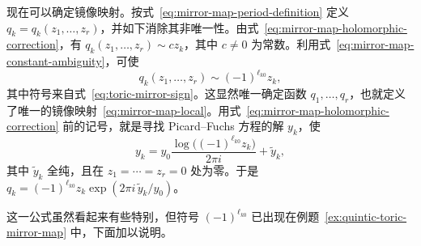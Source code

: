 现在可以确定镜像映射。按式~\eqref{eq:mirror-map-period-definition} 定义 $q_k=q_k(z_1,\ldots,z_r)$，并如下消除其非唯一性。由式~\eqref{eq:mirror-map-holomorphic-correction}，有 $q_k(z_1,\ldots,z_r)\sim cz_k$，其中 $c\ne0$ 为常数。利用式~\eqref{eq:mirror-map-constant-ambiguity}，可使
\begin{equation}\label{eq:toric-mirror-normalization}
q_k(z_1,\ldots,z_r)\sim(-1)^{\ell_{k0}}z_k,
\end{equation}
其中符号来自式~\eqref{eq:toric-mirror-sign}。这显然唯一确定函数 $q_1,\ldots,q_r$，也就定义了唯一的镜像映射~\eqref{eq:mirror-map-local}。用式~\eqref{eq:mirror-map-holomorphic-correction} 前的记号，就是寻找 Picard--Fuchs 方程的解 $y_k$，使
\begin{equation}\label{eq:toric-mirror-normalized-period}
y_k=y_0\frac{\log\bigl((-1)^{\ell_{k0}}z_k\bigr)}{2\pi i}+\widetilde y_k,
\end{equation}
其中 $\widetilde y_k$ 全纯，且在 $z_1=\cdots=z_r=0$ 处为零。于是
$q_k=(-1)^{\ell_{k0}}z_k\exp(2\pi i\,\widetilde y_k/y_0)$。

这一公式虽然看起来有些特别，但符号 $(-1)^{\ell_{k0}}$ 已出现在例题~\ref{ex:quintic-toric-mirror-map} 中，下面加以说明。

